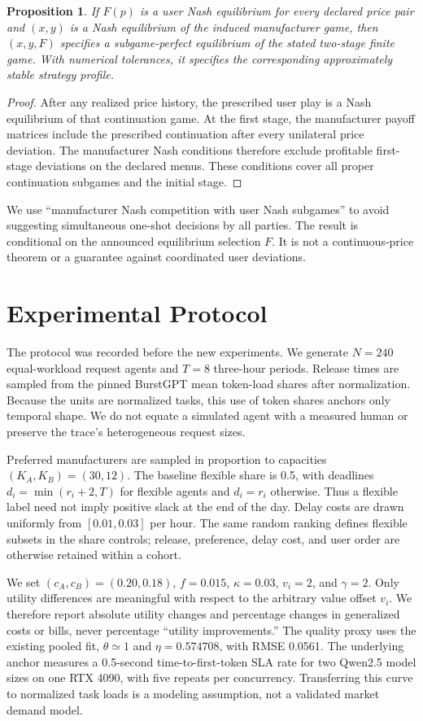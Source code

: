\documentclass[11pt,a4paper]{article}
\newtheorem{proposition}{Proposition}
\begin{document}
\begin{proposition}
If $F(p)$ is a user Nash equilibrium for every declared price pair and $(x,y)$ is a Nash equilibrium of the induced manufacturer game, then $(x,y,F)$ specifies a subgame-perfect equilibrium of the stated two-stage finite game. With numerical tolerances, it specifies the corresponding approximately stable strategy profile.
\end{proposition}
\begin{proof}
After any realized price history, the prescribed user play is a Nash equilibrium of that continuation game. At the first stage, the manufacturer payoff matrices include the prescribed continuation after every unilateral price deviation. The manufacturer Nash conditions therefore exclude profitable first-stage deviations on the declared menus. These conditions cover all proper continuation subgames and the initial stage.
\end{proof}

We use ``manufacturer Nash competition with user Nash subgames'' to avoid suggesting simultaneous one-shot decisions by all parties. The result is conditional on the announced equilibrium selection $F$. It is not a continuous-price theorem or a guarantee against coordinated user deviations.

\section{Experimental Protocol}
The protocol was recorded before the new experiments. We generate $N=240$ equal-workload request agents and $T=8$ three-hour periods. Release times are sampled from the pinned BurstGPT mean token-load shares after normalization. Because the units are normalized tasks, this use of token shares anchors only temporal shape. We do not equate a simulated agent with a measured human or preserve the trace's heterogeneous request sizes.

Preferred manufacturers are sampled in proportion to capacities $(K_A,K_B)=(30,12)$. The baseline flexible share is 0.5, with deadlines $d_i=\min(r_i+2,T)$ for flexible agents and $d_i=r_i$ otherwise. Thus a flexible label need not imply positive slack at the end of the day. Delay costs are drawn uniformly from $[0.01,0.03]$ per hour. The same random ranking defines flexible subsets in the share controls; release, preference, delay cost, and user order are otherwise retained within a cohort.

We set $(c_A,c_B)=(0.20,0.18)$, $f=0.015$, $\kappa=0.03$, $v_i=2$, and $\gamma=2$. Only utility differences are meaningful with respect to the arbitrary value offset $v_i$. We therefore report absolute utility changes and percentage changes in generalized costs or bills, never percentage ``utility improvements.'' The quality proxy uses the existing pooled fit, $\theta\simeq1$ and $\eta=0.574708$, with RMSE 0.0561. The underlying anchor measures a 0.5-second time-to-first-token SLA rate for two Qwen2.5 model sizes on one RTX 4090, with five repeats per concurrency. Transferring this curve to normalized task loads is a modeling assumption, not a validated market demand model.
\end{document}
